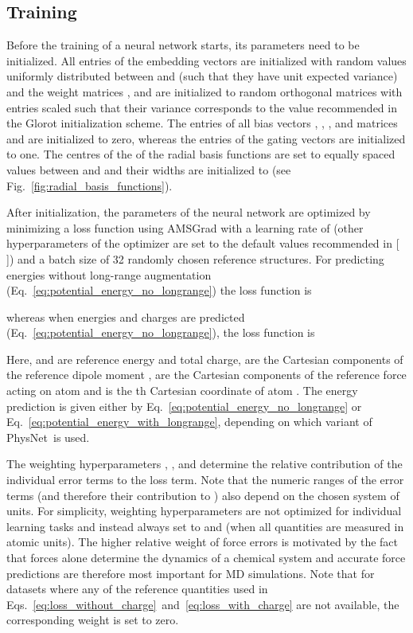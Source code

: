\documentclass[12pt]{article}
\makeatletter
\DeclareRobustCommand\citenum
{\begingroup
	\NAT@swatrue\let\NAT@ctype\z@\NAT@parfalse\let\textsuperscript\relax \NAT@citexnum[][]}
\newcommand{\nn}{PhysNet}
\makeatother
\begin{document}
\subsection{Training}
\label{sec:training}
Before the training of a neural network starts, its parameters need to
be initialized. All entries of the embedding vectors 
are initialized with random values uniformly distributed between
 and  (such that they have unit expected
variance) and the weight matrices , and
 are initialized to random orthogonal matrices with
entries scaled such that their variance corresponds to the value
recommended in the Glorot initialization
scheme.\cite{glorot2010understanding} The entries of all bias vectors
, , , 
and matrices  and  are initialized
to zero, whereas the entries of the gating vectors  are
initialized to one. The centres  of the of the radial basis
functions are set to  equally spaced values between  and  and their widths  are initialized to
 (see
Fig.~\ref{fig:radial_basis_functions}).

After initialization, the parameters of the neural network are
optimized by minimizing a loss function  using
AMSGrad\cite{reddi2018convergence} with a learning rate of 
(other hyperparameters of the optimizer are set to the default values
recommended in [\citenum{reddi2018convergence}]) and a batch size of
\num{32} randomly chosen reference structures. For predicting energies
without long-range augmentation
(Eq.~\ref{eq:potential_energy_no_longrange}) the loss function is

whereas when energies and charges are predicted
(Eq.~\ref{eq:potential_energy_no_longrange}), the loss function is


Here,  and  are reference energy and total
charge,  are the Cartesian components of the
reference dipole moment ,  are the Cartesian components of the reference force
 acting on atom  and  is the
th Cartesian coordinate of atom . The energy prediction 
is given either by Eq.~\ref{eq:potential_energy_no_longrange} or
Eq.~\ref{eq:potential_energy_with_longrange}, depending on which
variant of \nn\ is used.

The weighting hyperparameters , ,  and 
determine the relative contribution of the individual error terms to
the loss term. Note that the numeric ranges of the error terms (and
therefore their contribution to ) also depend on the
chosen system of units. For simplicity, weighting hyperparameters are
not optimized for individual learning tasks and instead always set to
 and  (when all quantities are
measured in atomic units). The higher relative weight of force errors
is motivated by the fact that forces alone determine the dynamics of a
chemical system and accurate force predictions are therefore most
important for MD simulations. Note that for datasets where any of the
reference quantities used in
Eqs.~\ref{eq:loss_without_charge}~and~\ref{eq:loss_with_charge} are
not available, the corresponding weight is set to zero.
\end{document}
